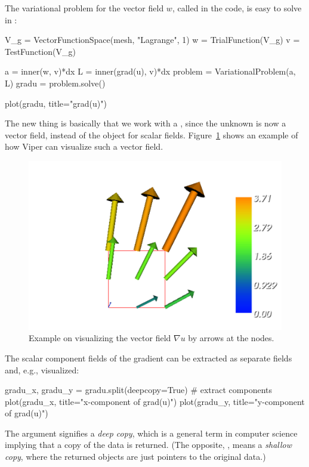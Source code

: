 The variational problem for the vector field $w$, called 
in the code, is easy to solve in \fenics:
\begin{python}
V_g = VectorFunctionSpace(mesh, "Lagrange", 1)
w = TrialFunction(V_g)
v = TestFunction(V_g)

a = inner(w, v)*dx
L = inner(grad(u), v)*dx
problem = VariationalProblem(a, L)
gradu = problem.solve()

plot(gradu, title="grad(u)")
\end{python}
The new thing is basically that we work with a
, since the unknown is now a vector
field, instead of the  object for scalar fields.
Figure~\ref{tut:poisson:2D:fig:ex1:gradu} shows an example of how Viper
can visualize such a vector field.

\begin{figure}
  \centering
  \includegraphics[width=\largefig]{chapters/langtangen/pdf/ex1_gradu.pdf}
  \caption{Example on visualizing the vector field
    $\nabla u$ by arrows at the nodes.}
  \label{tut:poisson:2D:fig:ex1:gradu}
\end{figure}

The scalar component fields of the gradient can be extracted as separate
fields and, e.g., visualized:
\begin{python}
gradu_x, gradu_y = gradu.split(deepcopy=True)  # extract components
plot(gradu_x, title="x-component of grad(u)")
plot(gradu_y, title="y-component of grad(u)")
\end{python}
The  argument signifies a \emph{deep copy}, which
is a general term in computer science implying that a copy of the data
is returned. (The opposite, , means a \emph{shallow
copy}, where the returned objects are just pointers to the original data.)

